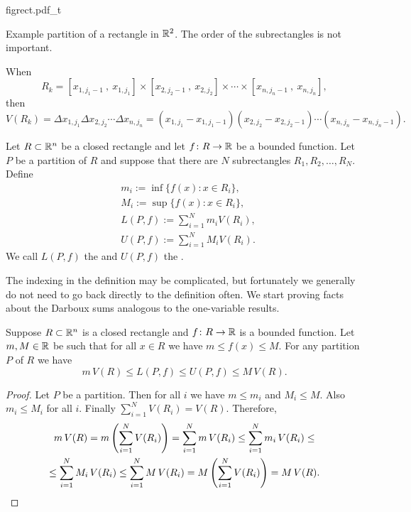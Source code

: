 \begin{defn}
\begin{myfigureht}
{figrect.pdf_t}
\caption{Example partition of a rectangle in ${\mathbb{R}}^2$.  The order of the
subrectangles is not important.\label{mv:figrect}}
\end{myfigureht}

When
\begin{equation*}
R_k = [x_{1,j_1-1}~,~ x_{1,j_1}]
\times
[x_{2,j_2-1}~,~ x_{2,j_2}]
\times
\cdots
\times
[x_{n,j_n-1}~,~ x_{n,j_n}] ,
\end{equation*}
then
\begin{equation*}
V(R_k) = 
\Delta x_{1,j_1}
\Delta x_{2,j_2}
\cdots
\Delta x_{n,j_n}
=
(x_{1,j_1}-x_{1,j_1-1})
(x_{2,j_2}-x_{2,j_2-1})
\cdots
(x_{n,j_n}-x_{n,j_n-1}) .
\end{equation*}

Let $R \subset {\mathbb{R}}^n$ be a closed rectangle and
let $f \colon R \to {\mathbb{R}}$ be a bounded function.  Let $P$ be a partition of
$R$ and suppose that there are $N$ subrectangles $R_1,R_2,\ldots,R_N$.
Define
\begin{align*}
& m_i := \inf \{ f(x) : x \in R_i \} , \\
& M_i := \sup \{ f(x) : x \in R_i \} , \\
& L(P,f) :=
\sum_{i=1}^N m_i V(R_i) , \\
& U(P,f) :=
\sum_{i=1}^N M_i V(R_i) .
\end{align*}
We call $L(P,f)$ the \emph{} and
$U(P,f)$ the \emph{}.
\end{defn}

The indexing in the definition may be complicated, but fortunately we generally
do not need to go back directly to the definition often.
We start proving facts about the Darboux sums analogous to the one-variable
results.

\begin{prop} \label{mv:sumulbound:prop}
Suppose $R \subset {\mathbb{R}}^n$ is a closed rectangle
and $f \colon R \to {\mathbb{R}}$ is a bounded function.  Let $m, M \in {\mathbb{R}}$ be 
such that for all $x \in R$ we have $m \leq f(x) \leq M$.  For any partition
$P$ of $R$
we have
\begin{equation*}
m \, V(R) \leq
L(P,f) \leq U(P,f)
\leq M\, V(R) .
\end{equation*}
\end{prop}

\begin{proof}
Let $P$ be a partition.  Then for all $i$ we have
$m \leq m_i$ and $M_i \leq M$.  Also $m_i \leq M_i$ for all $i$.  Finally
$\sum_{i=1}^N V(R_i) = V(R)$.  Therefore,
\begin{multline*}
m \, V(R) =
m \left( \sum_{i=1}^N V(R_i) \right)
=
\sum_{i=1}^N m \, V(R_i)
\leq
\sum_{i=1}^N m_i \, V(R_i)
\leq
\\
\leq
\sum_{i=1}^N M_i \, V(R_i)
\leq
\sum_{i=1}^N M \,V(R_i)
=
M \left( \sum_{i=1}^N V(R_i) \right)
=
M \,V(R) .  \qedhere
\end{multline*}
\end{proof}

